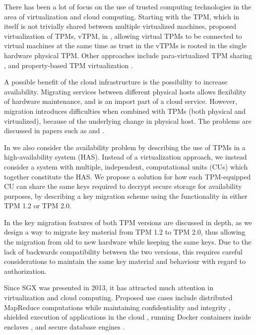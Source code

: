 There has been a lot of focus on the use of trusted computing technologies in the area of virtualization and cloud computing.
Starting with the TPM, which in itself is not trivially shared between multiple virtualized machines, \citeauthor{berger:2006} proposed virtualization of TPMs, vTPM, in \cite{berger:2006}, allowing virtual TPMs to be connected to virtual machines at the same time as trust in the vTPMs is rooted in the single hardware physical TPM.
Other approaches include para-virtualized TPM sharing \cite{england:2008}, and property-based TPM virtualization \cite{sadeghi:2008}.

A possible benefit of the cloud infrastructure is the possibility to increase availability.
Migrating services between different physical hosts allows flexibility of hardware maintenance, and is an import part of a cloud service.
However, migration introduces difficulties when combined with TPMs (both physical and virtualized), because of the underlying change in physical host.
The problems are discussed in papers such as \cite{danev:2011} and \cite{wan:2012}.

In  we also consider the availability problem by describing the use of TPMs in a high-availability system (HAS).
Instead of a virtualization approach, we instead consider a system with multiple, independent, computational units (CUs) which together constitute the HAS.
We propose a solution for how each TPM-equipped CU can share the same keys required to decrypt secure storage for availability purposes, by describing a key migration scheme using the functionality in either TPM 1.2 or TPM 2.0.

In  the key migration features of both TPM versions are discussed in depth, as we design a way to migrate key material from TPM 1.2 to TPM 2.0, thus allowing the migration from old to new hardware while keeping the same keys.
Due to the lack of backwards compatibility between the two versions, this requires careful considerations to maintain the same key material and behaviour with regard to authorization.

Since SGX was presented in 2013, it has attracted much attention in virtualization and cloud computing.
Proposed use cases include distributed MapReduce computations while maintaining confidentiality and integrity \cite{schuster:2015}, shielded execution of applications in the cloud \cite{baumann:2015}, running Docker containers inside enclaves \cite{arnautov:2016}, and secure database engines \cite{priebe:2018}.

